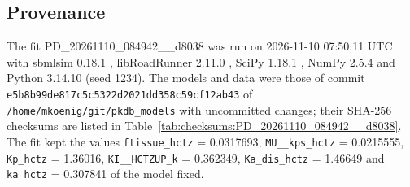 \subsection{Provenance}

The fit PD\_20261110\_084942\_\_d8038 was run on 2026-11-10 07:50:11 UTC with sbmlsim 0.18.1 \cite{Koenig2026_sbmlsim}, libRoadRunner 2.11.0 \cite{Welsh2023}, SciPy 1.18.1 \cite{Virtanen2020}, NumPy 2.5.4 \cite{Harris2020} and Python 3.14.10 (seed 1234). The models and data were those of commit \texttt{e5b8b99de817c5c5322d2021dd358c59cf12ab43} of \texttt{/home/mkoenig/git/pkdb\_models} with uncommitted changes; their SHA-256 checksums are listed in Table~\ref{tab:checksums:PD_20261110_084942__d8038}. The fit kept the values \texttt{ftissue\_hctz} = 0.0317693, \texttt{MU\_\_kps\_hctz} = 0.0215555, \texttt{Kp\_hctz} = 1.36016, \texttt{KI\_\_HCTZUP\_k} = 0.362349, \texttt{Ka\_dis\_hctz} = 1.46649 and \texttt{ka\_hctz} = 0.307841 of the model fixed.

